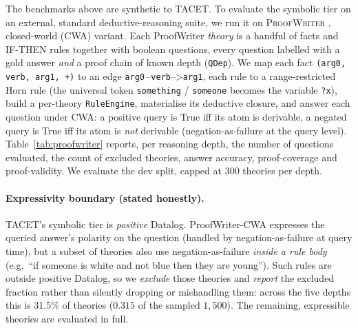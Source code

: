 \documentclass[11pt]{article}
\theoremstyle{plain}
\newcommand{\pwExclFrac}{0.315}
\newcommand{\pwExclPct}{31.5}
\begin{document}
The benchmarks above are synthetic to TACET. To evaluate the symbolic tier on
an external, standard deductive-reasoning suite, we run it on
\textsc{ProofWriter} \citep{tafjord2021proofwriter}, closed-world (CWA) variant.
Each ProofWriter \emph{theory} is a handful of facts and IF-THEN rules together
with boolean questions, every question labelled with a gold answer \emph{and} a
proof chain of known depth (\texttt{QDep}). We map each fact
\texttt{(arg0, verb, arg1, +)} to an edge \texttt{arg0}\,--\texttt{verb}-->\texttt{arg1},
each rule to a range-restricted Horn rule (the universal token \texttt{something}
/ \texttt{someone} becomes the variable \texttt{?x}), build a per-theory
\texttt{RuleEngine}, materialise its deductive closure, and answer each question
under CWA: a positive query is True iff its atom is derivable, a negated query is
True iff its atom is \emph{not} derivable (negation-as-failure at the query
level). Table~\ref{tab:proofwriter} reports, per reasoning depth, the number of
questions evaluated, the count of excluded theories, answer accuracy,
proof-coverage and proof-validity. We evaluate the dev split, capped at $300$
theories per depth.

\begin{table}[t]
\centering
\caption{Deductive reasoning with checkable proofs on ProofWriter (CWA), per
reasoning depth ($n$ = evaluated questions; Excl.\ = theories excluded for
rule-body negation). Depth $4$ is omitted: its per-depth raw counts were not
retained in the released run artifacts.}
\label{tab:proofwriter}

\end{table}

\paragraph{Expressivity boundary (stated honestly).} TACET's symbolic tier is
\emph{positive} Datalog. ProofWriter-CWA expresses the queried answer's polarity
on the question (handled by negation-as-failure at query time), but a subset of
theories also use negation-as-failure \emph{inside a rule body} (e.g.\ ``if
someone is white and not blue then they are young''). Such rules are outside
positive Datalog, so we \emph{exclude} those theories and \emph{report} the
excluded fraction rather than silently dropping or mishandling them: across the
five depths this is \pwExclPct{}\% of theories ($\pwExclFrac{}$ of the sampled
$1{,}500$). The remaining, expressible theories are evaluated in full.
\end{document}
